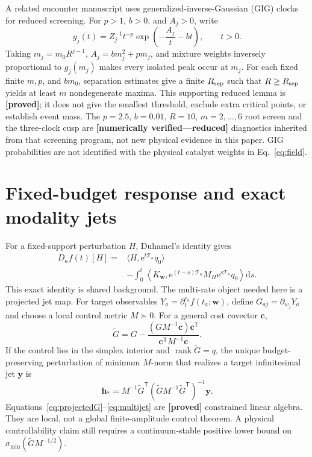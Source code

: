 \documentclass[aps,physrev,reprint,amsmath,amssymb,longbibliography,floatfix]{revtex4-2}
\newcommand{\dd}{\mathrm d}
\newcommand{\e}{\mathrm e}
\newcommand{\Tkill}{\mathcal T_{\kappa}}
\newcommand{\status}[1]{\textbf{[#1]}}
\begin{document}
A related encounter manuscript uses generalized-inverse-Gaussian (GIG) clocks
\cite{barndorffNielsenEtAl1978gig} for reduced screening.  For $p>1$, $b>0$,
and $A_j>0$, write
\begin{equation}
 g_j(t)=Z_j^{-1}t^{-p}
 \exp\!\left(-\frac{A_j}{t}-bt\right),\qquad t>0.
\label{eq:gig}
\end{equation}
Taking $m_j=m_0R^{j-1}$, $A_j=bm_j^2+pm_j$, and mixture weights inversely
proportional to $g_j(m_j)$ makes every isolated peak occur at $m_j$.  For
each fixed finite $m,p$, and $bm_0$, separation estimates give a finite
$R_{\rm sep}$ such that $R\ge R_{\rm sep}$ yields at least $m$
nondegenerate maxima.  This supporting reduced lemma is \status{proved}; it
does not give the smallest threshold, exclude extra critical points, or
establish event mass.  The $p=2.5$, $b=0.01$, $R=10$, $m=2,\ldots,6$ root
screen and the three-clock cusp are \status{numerically verified---reduced}
diagnostics inherited from that screening program, not new physical evidence
in this paper.  GIG probabilities are not identified with the physical
catalyst weights in Eq.~\eqref{eq:field}.

\section{Fixed-budget response and exact modality jets}\label{sec:response}

For a fixed-support perturbation $H$, Duhamel's identity gives
\begin{align}
D_\kappa f(t)[H]
={}&\langle H,\e^{t\Tkill}q_0\rangle\nonumber\\
&-\int_0^t
\left\langle K_{\bm w},
\e^{(t-s)\Tkill}M_H\e^{s\Tkill}q_0\right\rangle\dd s.
\label{eq:duhamel}
\end{align}
This exact identity is shared background.  The multi-rate object needed here
is a projected jet map.  For target observables
$Y_a=\partial_t^{r_a}f(t_a;\bm w)$, define
$G_{aj}=\partial_{w_j}Y_a$ and choose a local control metric $M\succ0$.
For a general cost covector $\bm c$,
\begin{equation}
 \widetilde G
 =G-\frac{(GM^{-1}\bm c)\bm c^{\mathsf T}}
 {\bm c^{\mathsf T}M^{-1}\bm c}.
\label{eq:projectedG}
\end{equation}
If the control lies in the simplex interior and
$\operatorname{rank}\widetilde G=q$, the unique budget-preserving perturbation
of minimum $M$-norm that realizes a target infinitesimal jet $\bm y$ is
\begin{equation}
 \bm h_*
 =M^{-1}\widetilde G^{\mathsf T}
 (\widetilde GM^{-1}\widetilde G^{\mathsf T})^{-1}\bm y.
\label{eq:multijet}
\end{equation}
Equations~\eqref{eq:projectedG}--\eqref{eq:multijet} are
\status{proved} constrained linear algebra.  They are local, not a global
finite-amplitude control theorem.  A physical controllability claim still
requires a continuum-stable positive lower bound on
$\sigma_{\min}(\widetilde GM^{-1/2})$.
\end{document}
